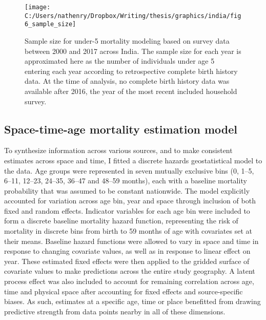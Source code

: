 \documentclass[
]{article}
\begin{document}
\begin{figure}[!hbt]

{\centering \texttt{[image: C:/Users/nathenry/Dropbox/Writing/thesis/graphics/india/fig6\_sample\_size]} 

}

\caption{Sample size for under-5 mortality modeling based on survey data between 2000 and 2017 across India. The sample size for each year is approximated here as the number of individuals under age 5 entering each year according to retrospective complete birth history data. At the time of analysis, no complete birth history data was available after 2016, the year of the most recent included household survey.}\label{fig:sample-size}
\end{figure}

\hypertarget{space-time-age-mortality-estimation-model}{%
\subsection{Space-time-age mortality estimation model}\label{space-time-age-mortality-estimation-model}}

To synthesize information across various sources, and to make consistent estimates across space and time, I fitted a discrete hazards geostatistical model to the data. Age groups were represented in seven mutually exclusive bins (0, 1--5, 6--11, 12--23, 24--35, 36--47 and 48--59 months), each with a baseline mortality probability that was assumed to be constant nationwide. The model explicitly accounted for variation across age bin, year and space through inclusion of both fixed and random effects. Indicator variables for each age bin were included to form a discrete baseline mortality hazard function, representing the risk of mortality in discrete bins from birth to 59 months of age with covariates set at their means. Baseline hazard functions were allowed to vary in space and time in response to changing covariate values, as well as in response to linear effect on year. These estimated fixed effects were then applied to the gridded surface of covariate values to make predictions across the entire study geography. A latent process effect was also included to account for remaining correlation across age, time and physical space after accounting for fixed effects and source-specific biases. As such, estimates at a specific age, time or place benefitted from drawing predictive strength from data points nearby in all of these dimensions.
\end{document}
